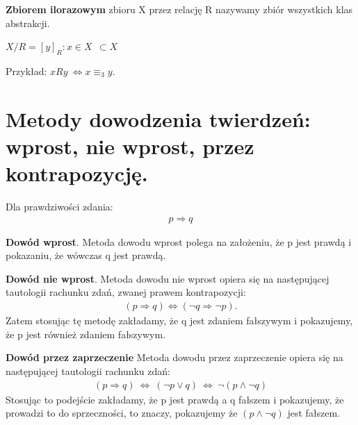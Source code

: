 \documentclass[12pt]{article}
\begin{document}
    \begin{definition}
        \textbf{Zbiorem ilorazowym} zbioru X przez relację R nazywamy zbiór wszystkich klas abstrakcji.

        $X/R = {[y]_{R}: x \in X} ~~ \subset X$
    \end{definition}

    Przykład: $xRy ~ \Leftrightarrow x \equiv_3 y$.

    \newpage


    \section{Metody dowodzenia twierdzeń: wprost, nie wprost, przez kontrapozycję.}

    Dla prawdziwości zdania:
    \begin{align*}
        p \Rightarrow q
    \end{align*}

    \begin{definition}
        \textbf{Dowód wprost}. Metoda dowodu wprost polega na założeniu, że p jest prawdą i pokazaniu, że wówczas q
        jest prawdą.
    \end{definition}

    \begin{definition}
        \textbf{Dowód nie wprost}. Metoda dowodu nie wprost opiera się na następującej tautologii rachunku
        zdań, zwanej prawem kontrapozycji:
        \begin{align*}
            (p \Rightarrow q) \Leftrightarrow (\neg q \Rightarrow \neg p).
        \end{align*}
        Zatem stosując tę metodę zakładamy, że q jest zdaniem fałszywym i pokazujemy, że p jest również
        zdaniem fałszywym.
    \end{definition}

    \begin{definition}
        \textbf{Dowód przez zaprzeczenie} Metoda dowodu przez zaprzeczenie opiera się na następującej tautologii rachunku
        zdań:
        \begin{align*}
            (p \Rightarrow q) ~ \Leftrightarrow ~ (\neg p \vee q) ~ \Leftrightarrow ~ \neg(p \wedge \neg q)
        \end{align*}
        Stosując to podejście zakładamy, że p jest prawdą a q fałszem i pokazujemy, że prowadzi to do sprzeczności,
        to znaczy, pokazujemy że $(p \wedge \neg q)$ jest fałszem.
    \end{definition}
\end{document}
